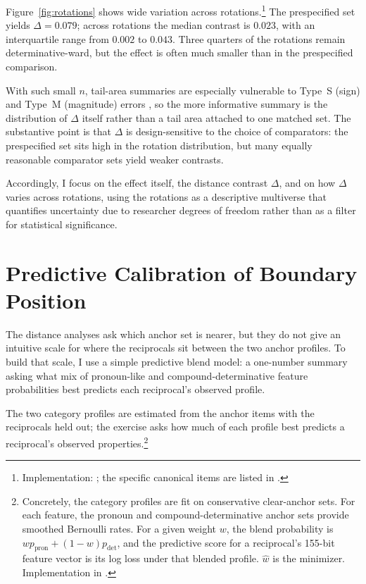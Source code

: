\documentclass[12pt]{article}
\begin{document}
Figure~\ref{fig:rotations} shows wide variation across rotations.\footnote{Implementation: ; the specific canonical items are listed in .} The prespecified set yields \(\Delta = 0.079\); across rotations the median contrast is \(0.023\), with an interquartile range from \(0.002\) to \(0.043\). Three quarters of the rotations remain determinative-ward, but the effect is often much smaller than in the prespecified comparison.

With such small $n$, tail-area summaries are especially vulnerable to Type~S (sign) and Type~M (magnitude) errors \parencite{gelman2014types}, so the more informative summary is the distribution of $\Delta$ itself rather than a tail area attached to one matched set. The substantive point is that $\Delta$ is design-sensitive to the choice of comparators: the prespecified set sits high in the rotation distribution, but many equally reasonable comparator sets yield weaker contrasts.

Accordingly, I focus on the effect itself, the distance contrast \(\Delta\), and on how \(\Delta\) varies across rotations, using the rotations as a descriptive multiverse \parencite{steegen2016increasing} that quantifies uncertainty due to researcher degrees of freedom rather than as a filter for statistical significance.



\section{Predictive Calibration of Boundary Position}

The distance analyses ask which anchor set is nearer, but they do not give an intuitive scale for where the reciprocals sit between the two anchor profiles. To build that scale, I use a simple predictive blend model: a one-number summary asking what mix of pronoun-like and compound-determinative feature probabilities best predicts each reciprocal's observed profile.

The two category profiles are estimated from the anchor items with the reciprocals held out; the exercise asks how much of each profile best predicts a reciprocal's observed properties.\footnote{Concretely, the category profiles are fit on conservative clear-anchor sets. For each feature, the pronoun and compound-determinative anchor sets provide smoothed Bernoulli rates. For a given weight $w$, the blend probability is $w p_{\text{pron}} + (1-w) p_{\text{det}}$, and the predictive score for a reciprocal's 155-bit feature vector is its log loss under that blended profile. $\hat w$ is the minimizer. Implementation in .}
\end{document}
